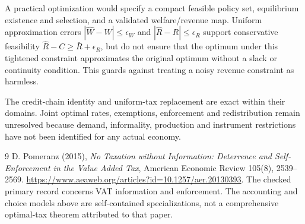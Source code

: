 \documentclass[11pt,a4paper]{article}
\begin{document}
A practical optimization would specify a compact feasible policy set, equilibrium existence and selection, and a validated welfare/revenue map. Uniform approximation errors $|\widehat W-W|\le\epsilon_W$ and $|\widehat R-R|\le\epsilon_R$ support conservative feasibility $\widehat R-C\ge\bar R+\epsilon_R$, but do not ensure that the optimum under this tightened constraint approximates the original optimum without a slack or continuity condition. This guards against treating a noisy revenue constraint as harmless.

The credit-chain identity and uniform-tax replacement are exact within their domains. Joint optimal rates, exemptions, enforcement and redistribution remain unresolved because demand, informality, production and instrument restrictions have not been identified for any actual economy.

\begin{thebibliography}{9}
 D. Pomeranz (2015), \emph{No Taxation without Information: Deterrence and Self-Enforcement in the Value Added Tax}, American Economic Review 105(8), 2539--2569. \url{https://www.aeaweb.org/articles?id=10.1257/aer.20130393}. The checked primary record concerns VAT information and enforcement. The accounting and choice models above are self-contained specializations, not a comprehensive optimal-tax theorem attributed to that paper.
\end{thebibliography}
\end{document}
